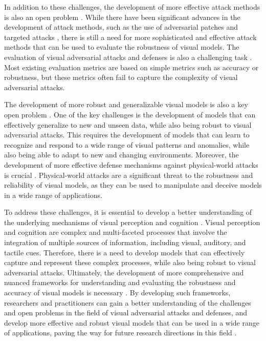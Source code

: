 \documentclass[11pt]{article}
\begin{document}
In addition to these challenges, the development of more effective attack methods is also an open problem \cite{ref215}. While there have been significant advances in the development of attack methods, such as the use of adversarial patches \cite{ref11} and targeted attacks \cite{ref212}, there is still a need for more sophisticated and effective attack methods that can be used to evaluate the robustness of visual models. The evaluation of visual adversarial attacks and defenses is also a challenging task \cite{ref216}. Most existing evaluation metrics are based on simple metrics such as accuracy or robustness, but these metrics often fail to capture the complexity of visual adversarial attacks.

The development of more robust and generalizable visual models is also a key open problem \cite{ref217}. One of the key challenges is the development of models that can effectively generalize to new and unseen data, while also being robust to visual adversarial attacks. This requires the development of models that can learn to recognize and respond to a wide range of visual patterns and anomalies, while also being able to adapt to new and changing environments. Moreover, the development of more effective defense mechanisms against physical-world attacks is crucial \cite{ref142}. Physical-world attacks are a significant threat to the robustness and reliability of visual models, as they can be used to manipulate and deceive models in a wide range of applications.

To address these challenges, it is essential to develop a better understanding of the underlying mechanisms of visual perception and cognition \cite{ref218}. Visual perception and cognition are complex and multi-faceted processes that involve the integration of multiple sources of information, including visual, auditory, and tactile cues. Therefore, there is a need to develop models that can effectively capture and represent these complex processes, while also being robust to visual adversarial attacks. Ultimately, the development of more comprehensive and nuanced frameworks for understanding and evaluating the robustness and accuracy of visual models is necessary \cite{ref219}. By developing such frameworks, researchers and practitioners can gain a better understanding of the challenges and open problems in the field of visual adversarial attacks and defenses, and develop more effective and robust visual models that can be used in a wide range of applications, paving the way for future research directions in this field \cite{ref3}.
\end{document}
